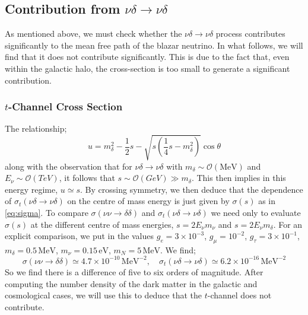 \documentclass[11pt]{article}
\numberwithin{equation}{section}
\numberwithin{figure}{section}
\numberwithin{table}{section}
\newcommand{\mO}{\mathcal{O}}
\begin{document}
\subsection{Contribution from $\nu\delta \rightarrow \nu\delta$}
As mentioned above, we must check whether the $\nu\delta \rightarrow \nu\delta$ process contributes significantly to the mean free path of the blazar neutrino. In what follows, we will find that it does not contribute significantly. This is due to the fact that, even within the galactic halo, the cross-section is too small to generate a significant contribution.
\subsubsection{$t$-Channel Cross Section}\label{sec:tchannel}

The relationship;
\begin{equation}
    u = m_\delta^2 - \frac{1}{2}s - \sqrt{s\left(\frac{1}{4}s - m_\delta^2\right)}\cos\theta
\end{equation}
along with the observation that for $\nu\delta \rightarrow \nu\delta$ with $m_\delta \sim \mO(\mathrm{MeV})$ and $E_\nu \sim \mO(TeV)$, it follows that $s \sim \mO(GeV) \gg m_\delta$. This then implies in this energy regime, $u \simeq s$. By crossing symmetry, we then deduce that the dependence of $\sigma_t(\nu\delta \rightarrow \nu\delta)$ on the centre of mass energy is just given by $\sigma(s)$ as in \eqref{eq:sigma}. To compare $\sigma(\nu\nu \rightarrow \delta \delta)$ and $\sigma_t(\nu\delta \rightarrow \nu\delta)$ we need only to evaluate $\sigma(s)$ at the different centre of mass energies, $s = 2E_\nu m_\nu$ and $s = 2 E_\nu m_\delta$. For an explicit comparison, we put in the values $g_e = 3 \times 10^{-3}$, $g_\mu = 10^{-2}$, $g_\tau = 3\times 10^{-1}$, $m_\delta = 0.5 \, \textrm{MeV}$, $m_\nu = 0.15 \, \textrm{eV}$, $m_N = 5\,\textrm{MeV}$. We find;
\begin{equation}
  \sigma(\nu\nu \rightarrow \delta\delta) \simeq 4.7\times 10^{-10} \, \textrm{MeV}^{-2}, \quad \sigma_t(\nu\delta \rightarrow \nu\delta) \simeq 6.2\times 10^{-16}\, \textrm{MeV}^{-2}
\end{equation}
So we find there is a difference of five to six orders of magnitude. After computing the number density of the dark matter in the galactic and cosmological cases, we will use this to deduce that the $t$-channel does not contribute.
\end{document}
